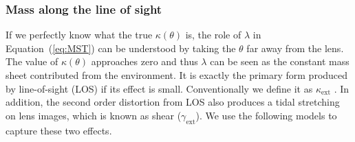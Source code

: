 \documentclass[useAMS,usenatbib]{mnras}
\newcommand{\sref}[1]{Section~\ref{#1}}
\newcommand{\eref}[1]{Equation~(\ref{#1})}
\newcommand{\Ddt}{D_{\Delta t}}
\begin{document}

\subsubsection{Mass along the line of sight}
\label{sec:ENV}



%
If we perfectly know what the true $\kappa(\theta)$ is, the role of $\lambda$ in \eref{eq:MST} can be understood by taking the $\theta$ far away from the lens. The value of $\kappa(\theta)$ approaches zero and thus $\lambda$ can be seen as the constant mass sheet contributed from the environment. It is exactly the primary form produced by line-of-sight (LOS) if its effect is small. Conventionally we define it as $\kappa_{\textrm{ext}}$ \citep[e.g.,][]{SuyuEtal10,WongEtal17,BirrerEtal18}. In addition, the second order distortion from LOS also produces a tidal stretching on lens images, which is known as shear ($\gamma_{\textrm{ext}}$).
We use the following models to capture these two effects.
\end{document}
